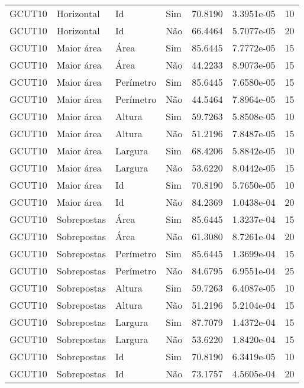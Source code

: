 \begin{tabular}{llllrrr}
    GCUT10    & Horizontal  & Id        & Sim         & 70.8190      & 3.3951e-05 & 10       \\
    GCUT10    & Horizontal  & Id        & Não         & 66.4464      & 5.7077e-05 & 20       \\
    GCUT10    & Maior área  & Área      & Sim         & 85.6445      & 7.7772e-05 & 15       \\
    GCUT10    & Maior área  & Área      & Não         & 44.2233      & 8.9073e-05 & 15       \\
    GCUT10    & Maior área  & Perímetro & Sim         & 85.6445      & 7.6580e-05 & 15       \\
    GCUT10    & Maior área  & Perímetro & Não         & 44.5464      & 7.8964e-05 & 15       \\
    GCUT10    & Maior área  & Altura    & Sim         & 59.7263      & 5.8508e-05 & 10       \\
    GCUT10    & Maior área  & Altura    & Não         & 51.2196      & 7.8487e-05 & 15       \\
    GCUT10    & Maior área  & Largura   & Sim         & 68.4206      & 5.8842e-05 & 10       \\
    GCUT10    & Maior área  & Largura   & Não         & 53.6220      & 8.0442e-05 & 15       \\
    GCUT10    & Maior área  & Id        & Sim         & 70.8190      & 5.7650e-05 & 10       \\
    GCUT10    & Maior área  & Id        & Não         & 84.2369      & 1.0438e-04 & 20       \\
    GCUT10    & Sobrepostas & Área      & Sim         & 85.6445      & 1.3237e-04 & 15       \\
    GCUT10    & Sobrepostas & Área      & Não         & 61.3080      & 8.7261e-04 & 20       \\
    GCUT10    & Sobrepostas & Perímetro & Sim         & 85.6445      & 1.3699e-04 & 15       \\
    GCUT10    & Sobrepostas & Perímetro & Não         & 84.6795      & 6.9551e-04 & 25       \\
    GCUT10    & Sobrepostas & Altura    & Sim         & 59.7263      & 6.4087e-05 & 10       \\
    GCUT10    & Sobrepostas & Altura    & Não         & 51.2196      & 5.2104e-04 & 15       \\
    GCUT10    & Sobrepostas & Largura   & Sim         & 87.7079      & 1.4372e-04 & 15       \\
    GCUT10    & Sobrepostas & Largura   & Não         & 53.6220      & 1.8420e-04 & 15       \\
    GCUT10    & Sobrepostas & Id        & Sim         & 70.8190      & 6.3419e-05 & 10       \\
    GCUT10    & Sobrepostas & Id        & Não         & 73.1757      & 4.5605e-04 & 20       \\
    \hline
\end{tabular}